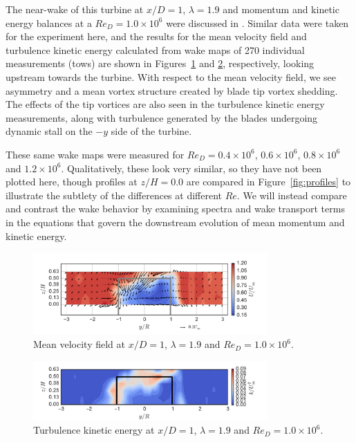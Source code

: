 \documentclass[energies,article,accept,moreauthors,pdftex,10pt,a4paper]{mdpi}
\theoremstyle{mdpi}
\newcounter{ex}
\newcounter{re}
\begin{document}
The near-wake of this turbine at $x/D=1$, $\lambda=1.9$ and momentum and
kinetic energy balances at a $Re_D = 1.0 \times 10^6$ were discussed in
\cite{Bachant2015-JoT}. Similar data were taken for the experiment here, and the
results for the mean velocity field and turbulence kinetic energy calculated
from wake maps of 270 individual measurements (tows) are shown in
Figures~\ref{fig:meancontquiv} and \ref{fig:kcont}, respectively, looking
upstream towards the turbine. With respect to the mean velocity field, we see
asymmetry and a mean vortex structure created by blade tip vortex shedding. The
effects of the tip vortices are also seen in the turbulence kinetic energy
measurements, along with turbulence generated by the blades undergoing dynamic
stall on the $-y$ side of the turbine.

These same wake maps were measured for $Re_D = 0.4 \times 10^6$, $0.6 \times
10^6$, $0.8 \times 10^6$ and $1.2 \times 10^6$. Qualitatively, these look very
similar, so they have not been plotted here, though profiles at $z/H=0.0$ are
compared in Figure~\ref{fig:profiles} to illustrate the subtlety of the
differences at different $Re$. We will instead compare and contrast the wake
behavior by examining spectra and wake transport terms in the equations that
govern the downstream evolution of mean momentum and kinetic energy.

\begin{figure}[H]
 \centering
 
 \includegraphics[width=0.8\textwidth]{figures/meancontquiv_10}
 
 \caption{Mean velocity field at $x/D=1$, $\lambda=1.9$ and $Re_D=1.0 \times
 10^6$.}
 
 \label{fig:meancontquiv}
\end{figure}
\unskip

\begin{figure}[H]
 \centering
 
 \includegraphics[width=0.8\textwidth]{figures/k_contours_10}
 
 \caption{Turbulence kinetic energy at $x/D=1$, $\lambda=1.9$ and $Re_D=1.0
 \times 10^6$.}
 
 \label{fig:kcont}
\end{figure}
\unskip
\end{document}
